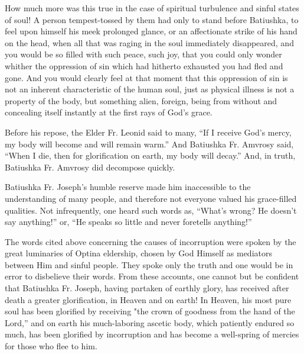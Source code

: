 How much more was this true in the case of spiritual turbulence and sinful states of soul! A person tempest-tossed by them had only to stand before Batiushka, to feel upon himself his meek prolonged glance, or an affectionate strike of his hand on the head, when all that was raging in the soul immediately disappeared, and you would be so filled with such peace, such joy, that you could only wonder whither the oppression of sin which had hitherto exhausted you had fled and gone. And you would clearly feel at that moment that this oppression of sin is not an inherent characteristic of the human soul, just as physical illness is not a property of the body, but something alien, foreign, being from without and concealing itself instantly at the first rays of God's grace.

Before his repose, the Elder Fr. Leonid said to many, “If I receive God's mercy, my body will become and will remain warm.” And Batiushka Fr. Amvrosy said, “When I die, then for glorification on earth, my body will decay.” And, in truth, Batiushka Fr. Amvrosy did decompose quickly.

Batiushka Fr. Joseph's humble reserve made him inaccessible to the understanding of many people, and therefore not everyone valued his grace-filled qualities. Not infrequently, one heard such words as, “What's wrong? He doesn't say anything!” or, “He speaks so little and never foretells anything!”

The words cited above concerning the causes of incorruption were spoken by the great luminaries of Optina eldership, chosen by God Himself as mediators between Him and sinful people. They spoke only the truth and one would be in error to disbelieve their words. From these accounts, one cannot but be confident that Batiushka Fr. Joseph, having partaken of earthly glory, has received after death a greater glorification, in Heaven and on earth! In Heaven, his most pure soul has been glorified by receiving "the crown of goodness from the hand of the Lord,” and on earth his much-laboring ascetic body, which patiently endured so much, has been glorified by incorruption and has become a well-spring of mercies for those who flee to him.

